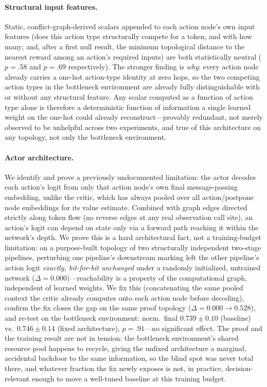 \documentclass[review,authoryear,3p,times]{elsarticle}
\begin{document}
\paragraph{Structural input features.} Static, conflict-graph-derived scalars
appended to each action node's own input features (does this action type
structurally compete for a token, and with how many; and, after a first null
result, the minimum topological distance to the nearest reward among an
action's required inputs) are both statistically neutral ($p=.58$ and
$p=.69$ respectively). The stronger finding is \emph{why}: every action node
already carries a one-hot action-type identity at zero hops, so the two
competing action types in the bottleneck environment are already fully
distinguishable with or without any structural feature. Any scalar computed
as a function of action type alone is therefore a deterministic function of
information a single learned weight on the one-hot could already
reconstruct---provably redundant, not merely observed to be unhelpful across
two experiments, and true of this architecture on any topology, not only the
bottleneck environment.

\paragraph{Actor architecture.} We identify and prove a previously
undocumented limitation: the actor decodes each action's logit from only that
action node's own final message-passing embedding, unlike the critic, which
has always pooled over all action/postpone node embeddings for its value
estimate. Combined with graph edges directed strictly along token flow (no
reverse edges at any real observation call site), an action's logit can
depend on state only via a forward path reaching it within the network's
depth. We prove this is a hard architectural fact, not a training-budget
limitation: on a purpose-built topology of two structurally independent
two-stage pipelines, perturbing one pipeline's downstream marking left the
other pipeline's action logit \emph{exactly, bit-for-bit unchanged} under a
randomly initialized, untrained network ($\Delta=0.000$)---reachability is a
property of the computational graph, independent of learned weights. We fix
this (concatenating the same pooled context the critic already computes onto
each action node before decoding), confirm the fix closes the gap on the
same proof topology ($\Delta=0.000\to0.528$), and re-test on the bottleneck
environment: norm.\ final $0.739\pm0.10$ (baseline) vs.\ $0.746\pm0.14$
(fixed architecture), $p=.91$---no significant effect. The proof and the
training result are not in tension: the bottleneck environment's shared
resource pool happens to recycle, giving the unfixed architecture a
marginal, accidental backdoor to the same information, so the blind spot was
never total there, and whatever fraction the fix newly exposes is not, in
practice, decision-relevant enough to move a well-tuned baseline at this
training budget.
\end{document}
